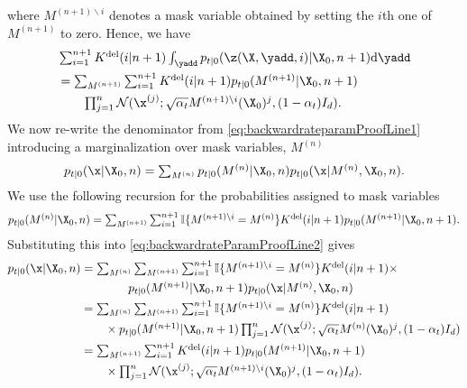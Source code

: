where $M^{(n+1) \backslash i}$ denotes a mask variable obtained by setting the $i$th one of $M^{(n+1)}$ to zero.
Hence, we have 
\begin{align}
    &\textstyle \sum_{i=1}^{n+1} K^{\text{del}}(i | n+1) \int_{\yadd} p_{t|0}(\z(\X, \yadd, i) | \X_0, n+1) \rmd \yadd \\
    &\textstyle  = \sum_{M^{(n+1)}} \sum_{i=1}^{n+1} K^{\text{del}}(i | n+1)  p_{t|0}(M^{(n+1)} | \X_0, n+1) \\
  & \qquad \textstyle \prod_{j=1}^{n}\mathcal{N}( \x^{(j)} ; \sqrt{\alpha_t} M^{(n+1) \backslash i}(\X_0)^j, (1-\alpha_t) I_d) .
    \label{eq:backwardrateParamProofLine1p5}
\end{align}
We now re-write the denominator from \eqref{eq:backwardrateparamProofLine1} introducing a marginalization over mask variables, $M^{(n)}$
\begin{equation}
    \textstyle p_{t|0}(\x | \X_0, n) = \sum_{M^{(n)}} p_{t|0}(M^{(n)} | \X_0, n) p_{t|0}(\x | M^{(n)}, \X_0, n)  . 
    \label{eq:backwardrateParamProofLine2}
\end{equation}
We use the following recursion for the probabilities assigned to mask variables
\begin{equation}
\textstyle    p_{t|0}(M^{(n)} | \X_0, n) = \sum_{M^{(n+1)}}  \sum_{i=1}^{n+1} \mathbb{I}\{ M^{(n+1) \backslash i} = M^{(n)} \} K^{\text{del}}(i | n+1) p_{t|0}(M^{(n+1)} | \X_0, n+1) . 
\end{equation}
 Substituting this into \eqref{eq:backwardrateParamProofLine2} gives
\begin{align}
    p_{t|0}(\x | \X_0, n) &\textstyle = \sum_{M^{(n)}}  \sum_{M^{(n+1)}} \sum_{i=1}^{n+1} \mathbb{I}\{ M^{(n+1) \backslash i} = M^{(n)} \} K^{\text{del}}(i | n+1)  \times\\
    &\textstyle  \qquad \qquad p_{t|0}(M^{(n+1)} | \X_0, n+1) p_{t|0}(\x | M^{(n)}, \X_0, n)\\
    &\textstyle = \sum_{M^{(n)}}  \sum_{M^{(n+1)}} \sum_{i=1}^{n+1} \mathbb{I}\{ M^{(n+1) \backslash i} = M^{(n)} \} K^{\text{del}}(i | n+1) \\ 
    &\textstyle  \qquad  \times  p_{t|0}(M^{(n+1)} | \X_0, n+1) \prod_{j=1}^n \mathcal{N}(\x^{(j)} ; \sqrt{\alpha_t} M^{(n)} (\X_0)^j, (1-\alpha_t) I_d)\\
                          &\textstyle = \sum_{M^{(n+1)}} \sum_{i=1}^{n+1} K^{\text{del}}(i | n+1) p_{t|0}(M^{(n+1)} | \X_0, n+1)\\
  & \qquad \textstyle \times \prod_{j=1}^n \mathcal{N}(\x^{(j)} ; \sqrt{\alpha_t} M^{(n+1) \backslash i} (\X_0)^j, (1-\alpha_t) I_d) .
\end{align}
